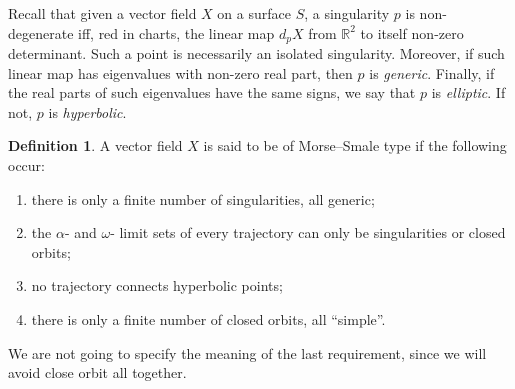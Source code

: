 \documentclass[a4paper, 11pt]{amsart}
\theoremstyle{plain}
\theoremstyle{definition}
\newtheorem{defin}[defin]{Definition}
\newcommand{\R}{\mathbb{R}}
\begin{document}
Recall that given a vector field $X$ on a surface $S$, a singularity $p$ is non-degenerate iff, red in charts, the linear map $d_pX$ from $\R^2$ to itself non-zero determinant. Such a point is necessarily an isolated singularity. Moreover, if such linear map has eigenvalues with non-zero real part, then $p$ is \emph{generic}. Finally, if the real parts of such eigenvalues have the same signs, we say that $p$ is \emph{elliptic}. If not, $p$ is \emph{hyperbolic}.
\begin{defin}\label{MS}
	A vector field $X$ is said to be of Morse--Smale type if the following occur:
	\begin{enumerate}
		\item there is only a finite number of singularities, all generic;
		\item the $\alpha$- and $\omega$- limit sets of every trajectory can only be singularities or closed orbits;
		\item no trajectory connects hyperbolic points;
		\item there is only a finite number of closed orbits, all ``simple''.
	\end{enumerate}
	We are not going to specify the meaning of the last requirement, since we will avoid close orbit all together.
\end{defin}
\end{document}
